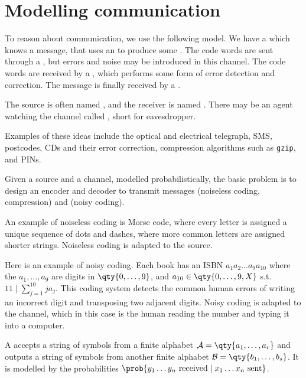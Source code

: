 \section{Modelling communication}

To reason about communication, we use the following model.
We have a  which knows a message, that uses an  to produce some .
The code words are sent through a , but errors and noise may be introduced in this channel.
The code words are received by a , which performs some form of error detection and correction.
The message is finally received by a .

The source is often named , and the receiver is named .
There may be an agent watching the channel called , short for eavesdropper.

Examples of these ideas include the optical and electrical telegraph, SMS, postcodes, CDs and their error correction, compression algorithms such as \texttt{gzip}, and PINs.

Given a source and a channel, modelled probabilistically, the basic problem is to design an encoder and decoder to transmit messages  (noiseless coding, compression) and  (noisy coding).

An example of noiseless coding is Morse code, where every letter is assigned a unique sequence of dots and dashes, where more common letters are assigned shorter strings.
Noiseless coding is adapted to the source.

Here is an example of noisy coding.
Each book has an ISBN $a_1 a_2 \dots a_9 a_{10}$ where the $a_1, \dots, a_9$ are digits in $\qty{0, \dots, 9}$, and $a_{10} \in \qty{0, \dots, 9, X}$ s.t. $11 \mid \sum_{j=1}^{10} j a_j$.
This coding system detects the common human errors of writing an incorrect digit and transposing two adjacent digits.
Noisy coding is adapted to the channel, which in this case is the human reading the number and typing it into a computer.

\begin{definition}
    A  accepts a string of symbols from a finite alphabet $\mathcal A = \qty{a_1, \dots, a_r}$ and outputs a string of symbols from another finite alphabet $\mathcal B = \qty{b_1, \dots, b_s}$.
    It is modelled by the probabilities $\prob{y_1 \dots y_n \text{ received} \mid x_1 \dots x_n \text{ sent}}$.
\end{definition}

